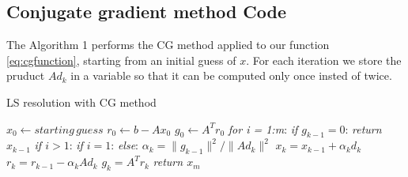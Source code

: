 \documentclass{article}
\begin{document}
\subsection{Conjugate gradient method Code}
The Algorithm 1 performs the CG method applied to our function \ref{eq:cgfunction}, starting from an initial guess of $x$. For each iteration we store the pruduct $Ad_k$ in a variable so that it can be computed only once insted of twice.
\makeatletter
\makeatother
\begin{algorithm}
\caption{LS resolution with CG method}
\begin{algorithmic}[1]
\State $x_0 \gets starting\,guess$
\State $r_0 \gets b -  Ax_0$
\State $g_0 \gets A^{T}r_0$ 
\State \emph{for i = 1:m}:
\State \quad\emph{if $g_{k-1} = 0$}:
\State\quad\quad\textit{return $x_{k-1}$}
\State \quad\emph{if $i > 1$}:
\State\quad{}
\State \quad\emph{if $i = 1$}: 
\State\quad{}
\State \quad\emph{else}: 
\State\quad{}
\State\quad $\alpha_{k} = \|g_{k-1}\|^2 / \|Ad_{k}\|^2$
\State\quad $x_{k} = x_{k-1} + \alpha_{k}d_{k}$
\State\quad $r_{k} = r_{k-1} - \alpha_{k}Ad_{k}$
\State\quad $g_{k} = A^{T}r_{k}$
\State\textit{return $x_{m}$}
\EndFunction
\end{algorithmic}
\end{algorithm}
\end{document}
